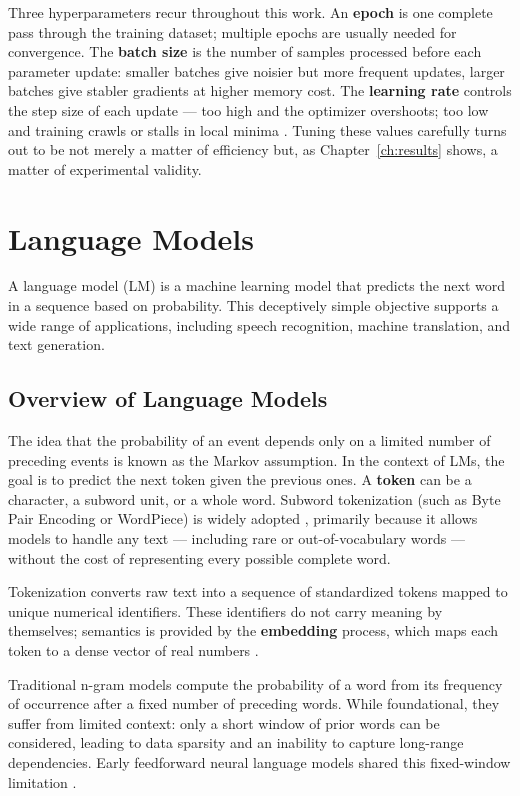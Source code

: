 Three hyperparameters recur throughout this work. An \textbf{epoch} is one complete pass through the training dataset; multiple epochs are usually needed for convergence. The \textbf{batch size} is the number of samples processed before each parameter update: smaller batches give noisier but more frequent updates, larger batches give stabler gradients at higher memory cost. The \textbf{learning rate} controls the step size of each update --- too high and the optimizer overshoots; too low and training crawls or stalls in local minima \cite{jm3_llm_book}. Tuning these values carefully turns out to be not merely a matter of efficiency but, as Chapter~\ref{ch:results} shows, a matter of experimental validity.

\section{Language Models}

A language model (LM) is a machine learning model that predicts the next word in a sequence based on probability. This deceptively simple objective supports a wide range of applications, including speech recognition, machine translation, and text generation.

\subsection{Overview of Language Models}

The idea that the probability of an event depends only on a limited number of preceding events is known as the Markov assumption. In the context of LMs, the goal is to predict the next token given the previous ones. A \textbf{token} can be a character, a subword unit, or a whole word. Subword tokenization (such as Byte Pair Encoding or WordPiece) is widely adopted \cite{jm3_llm_book}, primarily because it allows models to handle any text --- including rare or out-of-vocabulary words --- without the cost of representing every possible complete word.

Tokenization converts raw text into a sequence of standardized tokens mapped to unique numerical identifiers. These identifiers do not carry meaning by themselves; semantics is provided by the \textbf{embedding} process, which maps each token to a dense vector of real numbers \cite{jm3_llm_book}.

Traditional n-gram models compute the probability of a word from its frequency of occurrence after a fixed number of preceding words. While foundational, they suffer from limited context: only a short window of prior words can be considered, leading to data sparsity and an inability to capture long-range dependencies. Early feedforward neural language models shared this fixed-window limitation \cite{jm3_llm_book}.

